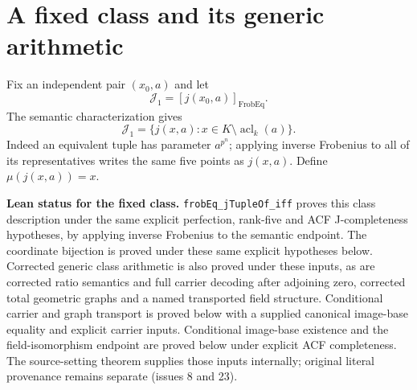 \documentclass[11pt,oneside]{article}
\theoremstyle{definition}
\theoremstyle{remark}
\newcommand{\acl}{\operatorname{acl}}
\newcommand{\Jrel}{\mathcal{J}}
\newcommand{\lean}[1]{\nolinkurl{#1}}
\begin{document}
\section{A fixed class and its generic arithmetic}\label{sec:genericops}

Fix an independent pair $(x_0,a)$ and let
\[
 \Jrel_1=[j(x_0,a)]_{\operatorname{FrobEq}}.
\]
The semantic characterization gives
\[
 \Jrel_1=\{j(x,a):x\in K\setminus\acl_k(a)\}.
\]
Indeed an equivalent tuple has parameter $a^{p^n}$; applying inverse Frobenius to all of
its representatives writes the same five points as $j(x,a)$.
Define $\mu(j(x,a))=x$.

\noindent\textbf{Lean status for the fixed class.}
\lean{frobEq_jTupleOf_iff} proves this class description under the same explicit
perfection, rank-five and ACF J-completeness hypotheses, by applying inverse
Frobenius to the semantic endpoint. The coordinate bijection is proved under these
same explicit hypotheses below. Corrected generic class arithmetic is also proved
under these inputs, as are corrected ratio semantics and full carrier decoding after
adjoining zero, corrected total geometric graphs and a named transported field structure.
Conditional carrier and graph transport is proved below with a supplied canonical
image-base equality and explicit carrier inputs. Conditional image-base existence and the
field-isomorphism endpoint are proved below under explicit ACF completeness. The
source-setting theorem supplies those inputs internally; original literal provenance
remains separate (issues 8 and 23).
\end{document}
